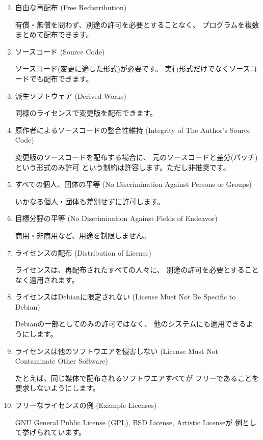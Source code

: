\documentclass[mingoth,a4paper]{jsarticle}
\begin{document}
\begin{enumerate}
 \item 自由な再配布 (Free Redistribution)

有償・無償を問わず、別途の許可を必要とすることなく、
プログラムを複数まとめて配布できます。

 \item ソースコード (Source Code)

ソースコード(変更に適した形式)が必要です。
実行形式だけでなくソースコードでも配布できます。

 \item 派生ソフトウェア (Derived Works)

同様のライセンスで変更版を配布できます。

 \item 原作者によるソースコードの整合性維持
   (Integrity of The Author's Source Code)

変更版のソースコードを配布する場合に、
元のソースコードと差分(パッチ)という形式のみ許可
という制約は許容します。ただし非推奨です。

 \item すべての個人、団体の平等
   (No Discrimination Against Persons or Groups)

いかなる個人・団体も差別せずに許可します。

 \item 目標分野の平等
   (No Discrimination Against Fields of Endeavor)

商用・非商用など、用途を制限しません。

 \item ライセンスの配布
   (Distribution of License)

ライセンスは、再配布されたすべての人々に、
別途の許可を必要とすることなく適用されます。

 \item ライセンスはDebianに限定されない
   (License Must Not Be Specific to Debian)

Debianの一部としてのみの許可ではなく、
他のシステムにも適用できるようにします。

 \item ライセンスは他のソフトウエアを侵害しない
   (License Must Not Contaminate Other Software)

たとえば、同じ媒体で配布されるソフトウエアすべてが
フリーであることを要求しないようにします。

 \item フリーなライセンスの例
   (Example Licenses)

GNU General Public License (GPL), BSD License, Artistic Licenseが
例として挙げられています。

\end{enumerate}
\end{document}
